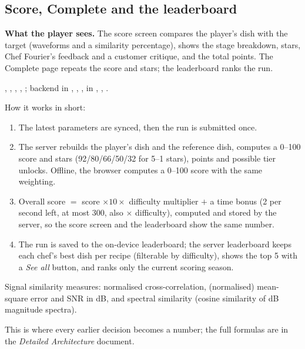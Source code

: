 \documentclass[11pt,a4paper]{article}
\begin{document}
\subsection{Score, Complete and the leaderboard}\label{sec:score}
\textbf{What the player sees.} The score screen compares the player's dish with the
target (waveforms and a similarity percentage), shows the stage breakdown, stars,
Chef Fourier's feedback and a customer critique, and the total points. The
Complete page repeats the score and stars; the leaderboard ranks the run.
\begin{filesbox}
, ,
, ,
; backend  in
, , ,  in
, ,
.
\end{filesbox}
How it works in short:
\begin{enumerate}
\item The latest parameters are synced, then the run is submitted once.
\item The server rebuilds the player's dish and the reference dish, computes a
  0--100 score and stars (92/80/66/50/32 for 5--1 stars), points and possible tier
  unlocks. Offline, the browser computes a 0--100 score with the same weighting.
\item Overall score $=$ score $\times10\times$ difficulty multiplier $+$ a
  time bonus (2 per second left, at most 300, also $\times$ difficulty), computed and stored by
  the server, so the score screen and the leaderboard show the same number.
\item The run is saved to the on-device leaderboard; the server leaderboard keeps
  each chef's best dish per recipe (filterable by difficulty), shows the top 5 with a
  \emph{See all} button, and ranks only the current scoring season.
\end{enumerate}
\begin{conceptbox}
Signal similarity measures: normalised cross-correlation, (normalised) mean-square
error and SNR in dB, and spectral similarity (cosine similarity of dB magnitude
spectra).
\end{conceptbox}
\begin{impactbox}
This is where every earlier decision becomes a number; the full formulas are in
the \emph{Detailed Architecture} document.
\end{impactbox}
\end{document}
